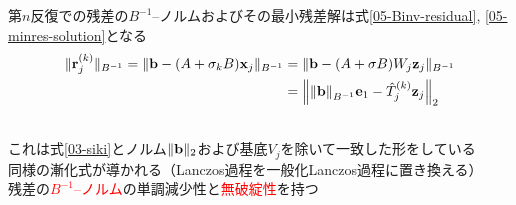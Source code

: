 

第$n$反復での残差の$B^{-1}$--ノルムおよびその最小残差解は式\eqref{05-Binv-residual}, \eqref{05-minres-solution}となる
\begin{align}
	\|\vb{r}_{j}^{(k)}\|_{B^{-1}} = \|\vb{b} - (A + \sigma_{k}B)\vb{x}_{j}\|_{B^{-1}}
		&= \|\vb{b} - (A + \sigma B)W_{j}\vb{z}_{j} \|_{B^{-1}} \notag \\
		&= \left\| \norm{\vb{b}}_{B^{-1}}\vb{e}_1 - \hat{T}_{j}^{(k)} \vb{z}_{j} \right\|_2
		\label{05-Binv-residual}\\
	&\hspace*{-17.5cm}\Rightarrow \ \vb{x}_{n}^{(k)} = \|\vb{b}\|_{B^{-1}} W_{j} R_{j}^{-1} Q_{j}^{\htop} \vb{e}_1
	\label{05-minres-solution}
\end{align}
これは式\eqref{03-siki}とノルム$\|\vb{b}\|_2$および基底$V_{j}$を除いて一致した形をしている\\
\myitem 同様の漸化式が導かれる（Lanczos過程を一般化Lanczos過程に置き換える）\\
\myitem 残差の\textcolor{red}{$B^{-1}$--ノルム}の単調減少性と\textcolor{red}{無破綻性}を持つ